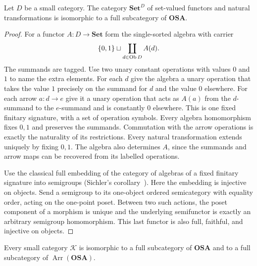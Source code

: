 \begin{lem}\label{lem-osa-diagram-embedding}
Let $D$ be a small category. The category $\mathbf{Set}^{D}$ of
set-valued functors and natural transformations is isomorphic to a full
subcategory of $\mathbf{OSA}$.
\end{lem}

\begin{proof}
For a functor $A:D\to\mathbf{Set}$ form the single-sorted algebra with
carrier
\[
 \{0,1\}\sqcup\coprod_{d\in\operatorname{Ob} D} A(d).
\]
The summands are tagged. Use two unary constant operations with values
$0$ and $1$ to name the extra elements. For each $d$ give
the algebra a unary operation that takes the value $1$ precisely on the
summand for $d$ and the value $0$ elsewhere. For each arrow $a:d\to e$
give it a unary operation that acts as $A(a)$ from the $d$-summand to
the $e$-summand and is constantly $0$ elsewhere. This is one fixed
finitary signature, with a set of operation symbols. Every algebra
homomorphism fixes $0,1$ and preserves the summands. Commutation with the
arrow operations is exactly the naturality of its restrictions. Every
natural transformation extends uniquely by fixing $0,1$. The algebra
also determines $A$, since the summands and arrow maps can be recovered
from its labelled operations.

Use the classical full embedding of the category of algebras of a
fixed finitary signature into semigroups (Sichler's
corollary~\cite{sichler-semigroup-embedding}). Here the embedding is
injective on objects. Send a semigroup to its one-object ordered
semicategory with equality order, acting on the one-point poset. Between
two such actions, the poset component of a morphism is unique and the
underlying semifunctor is exactly an arbitrary semigroup homomorphism.
This last functor is also full, faithful, and injective on objects.
\end{proof}

\begin{thm}\label{thm-osa-full-embedding}
Every small category $\mathcal K$ is isomorphic to a full subcategory of
$\mathbf{OSA}$ and to a full subcategory of
$\operatorname{Arr}(\mathbf{OSA})$.
\end{thm}

